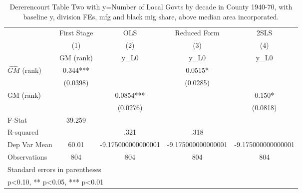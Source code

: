 \begin{table}[htbp]\centering
\def\sym#1{\ifmmode^{#1}\else\(^{#1}\)\fi}
\caption{Dererencourt Table Two with y=Number of Local Govts by decade in County 1940-70, with baseline y, division FEs, mfg and black mig share, above median area incorporated.}
\begin{tabular}{l*{4}{c}}
\toprule
                    & First Stage   &         OLS   &Reduced Form   &        2SLS   \\
                    &\multicolumn{1}{c}{(1)}&\multicolumn{1}{c}{(2)}&\multicolumn{1}{c}{(3)}&\multicolumn{1}{c}{(4)}\\
                    &\multicolumn{1}{c}{GM  (rank)}&\multicolumn{1}{c}{y\_L0}&\multicolumn{1}{c}{y\_L0}&\multicolumn{1}{c}{y\_L0}\\
\midrule
$\hat{GM}$ (rank)   &       0.344***&               &      0.0515*  &               \\
                    &    (0.0398)   &               &    (0.0285)   &               \\
\addlinespace
GM  (rank)          &               &      0.0854***&               &       0.150*  \\
                    &               &    (0.0276)   &               &    (0.0818)   \\
\midrule
F-Stat              &      39.259   &               &               &               \\
R-squared           &               &        .321   &        .318   &               \\
Dep Var Mean        &       60.01   &-9.175000000000001   &-9.175000000000001   &-9.175000000000001   \\
Observations        &         804   &         804   &         804   &         804   \\
\bottomrule
\multicolumn{5}{l}{\footnotesize Standard errors in parentheses}\\
\multicolumn{5}{l}{\footnotesize * p<0.10, ** p<0.05, *** p<0.01}\\
\end{tabular}
\end{table}
